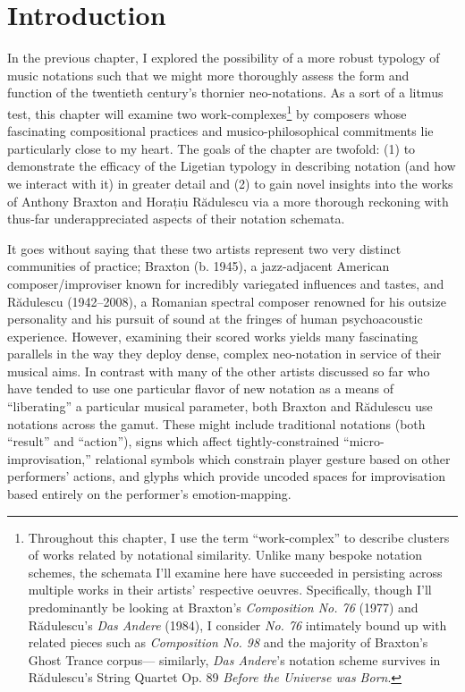 \section{Introduction}


    In the previous chapter, I explored the possibility of a more robust typology of music notations such that we might more thoroughly assess the form and function of the twentieth century's thornier neo-notations. As a sort of a litmus test, this chapter will examine two work-complexes\footnote{Throughout this chapter, I use the term ``work-complex'' to describe clusters of works related by notational similarity. Unlike many bespoke notation schemes, the schemata I'll examine here have succeeded in persisting across multiple works in their artists' respective oeuvres. Specifically, though I'll predominantly be looking at Braxton's \textit{Composition No. 76} (1977) and Rădulescu's \textit{Das Andere} (1984), I consider \textit{No. 76} intimately bound up with related pieces such as \textit{Composition No. 98} and the majority of Braxton's Ghost Trance corpus--- similarly, \textit{Das Andere}'s notation scheme survives in Rădulescu's String Quartet Op. 89 \textit{Before the Universe was Born}.} by composers whose fascinating compositional practices and musico-philosophical commitments lie particularly close to my heart. The goals of the chapter are twofold: (1) to demonstrate the efficacy of the Ligetian typology in describing notation (and how we interact with it) in greater detail and (2) to gain novel insights into the works of Anthony Braxton and Horațiu Rădulescu via a more thorough reckoning with thus-far underappreciated aspects of their notation schemata.


    It goes without saying that these two artists represent two very distinct communities of practice; Braxton (b. 1945), a jazz-adjacent American composer/improviser known for incredibly variegated influences and tastes, and Rădulescu (1942--2008), a Romanian spectral composer renowned for his outsize personality and his pursuit of sound at the fringes of human psychoacoustic experience. However, examining their scored works yields many fascinating parallels in the way they deploy dense, complex neo-notation in service of their musical aims. In contrast with many of the other artists discussed so far who have tended to use one particular flavor of new notation as a means of ``liberating'' a particular musical parameter, both Braxton and Rădulescu use notations across the gamut. These might include traditional notations (both ``result'' and ``action''), signs which affect tightly-constrained ``micro-improvisation,'' relational symbols which constrain player gesture based on other performers' actions, and glyphs which provide uncoded spaces for improvisation based entirely on the performer's emotion-mapping.

